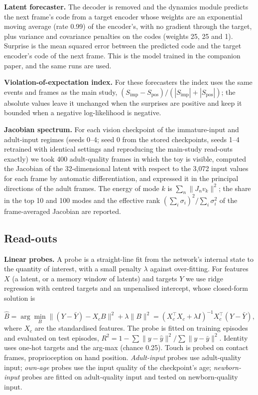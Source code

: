 \documentclass{article}
\begin{document}
\textbf{Latent forecaster.} The decoder is removed and the dynamics module predicts the next frame's code from a target encoder whose weights are an exponential moving average (rate 0.99) of the encoder's, with no gradient through the target, plus variance and covariance penalties on the codes (weights 25, 25 and 1). Surprise is the mean squared error between the predicted code and the target encoder's code of the next frame. This is the model trained in the companion paper, and the same runs are used.

\textbf{Violation-of-expectation index.} For these forecasters the index uses the same events and frames as the main study, \((S_{\text{imp}}-S_{\text{pos}})/(|S_{\text{imp}}|+|S_{\text{pos}}|)\); the absolute values leave it unchanged when the surprises are positive and keep it bounded when a negative log-likelihood is negative.

\textbf{Jacobian spectrum.} For each vision checkpoint of the immature-input and adult-input regimes (seeds 0--4; seed 0 from the stored checkpoints, seeds 1--4 retrained with identical settings and reproducing the main-study read-outs exactly) we took 400 adult-quality frames in which the toy is visible, computed the Jacobian of the 32-dimensional latent with respect to the 3,072 input values for each frame by automatic differentiation, and expressed it in the principal directions of the adult frames. The energy of mode \(k\) is \(\sum_n\lVert J_nv_k\rVert^2\); the share in the top 10 and 100 modes and the effective rank \((\sum_i\sigma_i)^2/\sum_i\sigma_i^2\) of the frame-averaged Jacobian are reported.

\hypertarget{read-outs}{%
\subsection{Read-outs}\label{read-outs}}

\textbf{Linear probes.} A probe is a straight-line fit from the network's internal state to the quantity of interest, with a small penalty \(\lambda\) against over-fitting. For features \(X\) (a latent, or a memory window of latents) and targets \(Y\) we use ridge regression with centred targets and an unpenalised intercept, whose closed-form solution is

\begin{equation}\hat B=\arg\min_B\lVert (Y-\bar Y)-X_cB\rVert^2+\lambda\lVert B\rVert^2=(X_c^\top X_c+\lambda I)^{-1}X_c^\top(Y-\bar Y),\end{equation}
where \(X_c\) are the standardised features. The probe is fitted on training episodes and evaluated on test episodes, \(R^2=1-\sum\lVert y-\hat y\rVert^2/\sum\lVert y-\bar y\rVert^2\). Identity uses one-hot targets and the arg-max (chance 0.25). Touch is probed on contact frames, proprioception on hand position. \emph{Adult-input} probes use adult-quality input; \emph{own-age} probes use the input quality of the checkpoint's age; \emph{newborn-input} probes are fitted on adult-quality input and tested on newborn-quality input.
\end{document}
